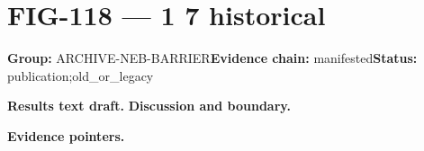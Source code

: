 \clearpage
\section{FIG-118 --- 1 7 historical}
\label{figpage:fig-118}
\textbf{Group:} ARCHIVE-NEB-BARRIER\quad \textbf{Evidence chain:} manifested\quad \textbf{Status:} publication;old\_or\_legacy

\textbf{Results text draft.} 
\textbf{Discussion and boundary.} 


\textbf{Evidence pointers.}



\vfill
